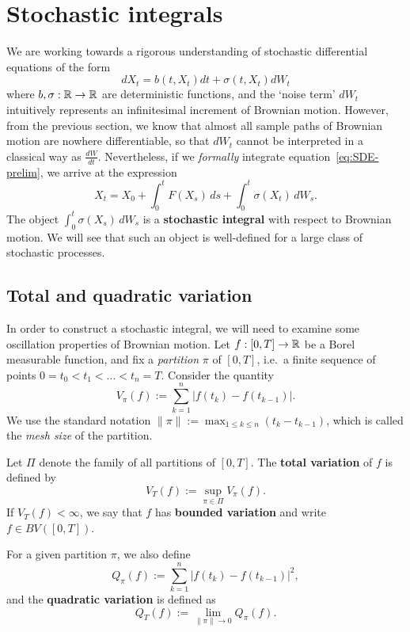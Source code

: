 \section{Stochastic integrals}

We are working towards a rigorous understanding of stochastic differential equations of the form
\begin{equation}
	\label{eq:SDE-prelim}
	dX_t = b(t,X_t)dt + \sigma(t,X_t) dW_t
\end{equation}
where $b, \sigma : \mathbb{R}\to\mathbb{R}$ are deterministic functions, and the `noise term' $dW_t$ intuitively represents an infinitesimal increment of Brownian motion. However, from the previous section, we know that almost all sample paths of Brownian motion are nowhere differentiable, so that $dW_t$ cannot be interpreted in a classical way as $\frac{dW}{dt}$. Nevertheless, if we \emph{formally} integrate equation~\eqref{eq:SDE-prelim}, we arrive at the expression
\begin{equation}
	X_t = X_0 + \int_0^t F(X_s) \,ds + \int_0^t \sigma(X_t) \,dW_s.
\end{equation}
The object $\int_0^t \sigma(X_s)\,dW_s$ is a \textbf{stochastic integral} with respect to Brownian motion. We will see that such an object is well-defined for a large class of stochastic processes.

\subsection{Total and quadratic variation}

In order to construct a stochastic integral, we will need to examine some oscillation properties of Brownian motion. Let $f : [0, T] \to \mathbb{R}$ be a Borel measurable function, and fix a \emph{partition} $\pi$ of $[0, T]$, i.e.\ a finite sequence of points $0 = t_0 < t_1 < \ldots < t_n = T$. Consider the quantity
\begin{equation*}
    V_\pi(f) := \sum_{k=1}^n |f(t_k) - f(t_{k-1})|.
\end{equation*}
We use the standard notation $\|\pi\| := \max_{1 \le k \le n}(t_k - t_{k-1})$, which is called the \emph{mesh size} of the partition.

\begin{definition}
\label{def:BV}
Let $\Pi$ denote the family of all partitions of $[0, T]$. The \textbf{total variation} of $f$ is defined by
\begin{equation*}
    V_T(f) := \sup_{\pi \in \Pi} V_\pi(f).
\end{equation*}
If $V_T(f) < \infty$, we say that $f$ has \textbf{bounded variation} and write $f \in BV([0,T])$.

For a given partition $\pi$, we also define
\begin{equation*}
    Q_\pi(f) := \sum_{k=1}^n |f(t_k) - f(t_{k-1})|^2,
\end{equation*}
and the \textbf{quadratic variation} is defined as
\begin{equation}
\label{eq:quadvar}
    Q_T(f) := \lim_{\|\pi\|\to 0} Q_\pi(f).
\end{equation}
\end{definition}

